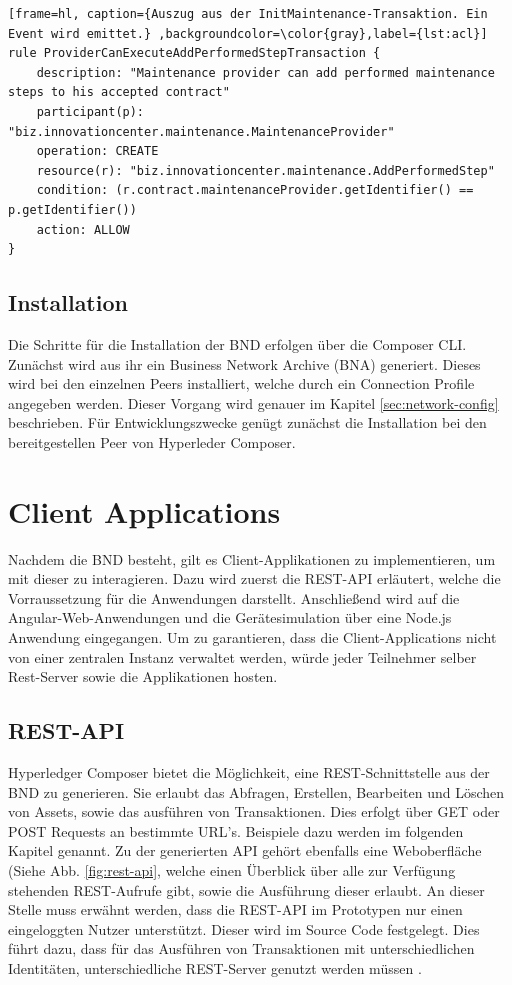 \begin{lstfloat}
\begin{lstlisting}[frame=hl, caption={Auszug aus der InitMaintenance-Transaktion. Ein Event wird emittet.} ,backgroundcolor=\color{gray},label={lst:acl}]
rule ProviderCanExecuteAddPerformedStepTransaction {
    description: "Maintenance provider can add performed maintenance steps to his accepted contract"
    participant(p): "biz.innovationcenter.maintenance.MaintenanceProvider"
    operation: CREATE
    resource(r): "biz.innovationcenter.maintenance.AddPerformedStep"
    condition: (r.contract.maintenanceProvider.getIdentifier() == p.getIdentifier())
    action: ALLOW
}
\end{lstlisting} 
\end{lstfloat}

\subsection{Installation}
Die Schritte für die Installation der BND erfolgen über die Composer CLI. Zunächst wird aus ihr ein Business Network Archive (BNA) generiert. Dieses wird bei den einzelnen Peers installiert, welche durch ein Connection Profile angegeben werden. Dieser Vorgang wird genauer im Kapitel \ref{sec:network-config} beschrieben. Für Entwicklungszwecke genügt zunächst die Installation bei den bereitgestellen Peer von Hyperleder Composer.

\section{Client Applications}
Nachdem die BND besteht, gilt es Client-Applikationen zu implementieren, um mit dieser zu interagieren. Dazu wird zuerst die REST-API erläutert, welche die Vorraussetzung für die Anwendungen darstellt. Anschließend wird auf die Angular-Web-Anwendungen und die Gerätesimulation über eine Node.js Anwendung eingegangen. Um zu garantieren, dass die Client-Applications nicht von einer zentralen Instanz verwaltet werden, würde jeder Teilnehmer selber Rest-Server sowie die Applikationen hosten.

\subsection{REST-API}
\label{subsec:REST}
Hyperledger Composer bietet die Möglichkeit, eine REST-Schnittstelle aus der BND zu generieren. Sie erlaubt das Abfragen, Erstellen, Bearbeiten und Löschen von Assets, sowie das ausführen von Transaktionen. Dies erfolgt über GET oder POST Requests an bestimmte URL's. Beispiele dazu werden im folgenden Kapitel genannt. Zu der generierten API gehört ebenfalls eine Weboberfläche (Siehe Abb. \ref{fig:rest-api}, welche einen Überblick über alle zur Verfügung stehenden REST-Aufrufe gibt, sowie die Ausführung dieser erlaubt. An dieser Stelle muss erwähnt werden, dass die REST-API im Prototypen nur einen eingeloggten Nutzer unterstützt. Dieser wird im Source Code festgelegt. Dies führt dazu, dass für das Ausführen von Transaktionen mit unterschiedlichen Identitäten, unterschiedliche REST-Server genutzt werden müssen \cite{HyperledgerComposerTeamRESTAPIHyperledger}.

